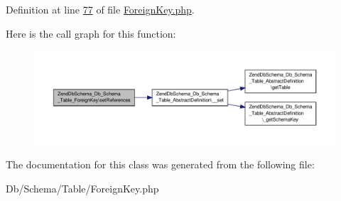 Definition at line \hyperlink{ForeignKey_8php_source_l00077}{77} of file \hyperlink{ForeignKey_8php_source}{Foreign\-Key.\-php}.



Here is the call graph for this function\-:\nopagebreak
\begin{figure}[H]
\begin{center}
\leavevmode
\includegraphics[width=350pt]{classZendDbSchema__Db__Schema__Table__ForeignKey_a333403da95af60a2b4bd18952d1136f3_cgraph}
\end{center}
\end{figure}




The documentation for this class was generated from the following file\-:\begin{DoxyCompactItemize}
\item 
Db/\-Schema/\-Table/Foreign\-Key.\-php\end{DoxyCompactItemize}
